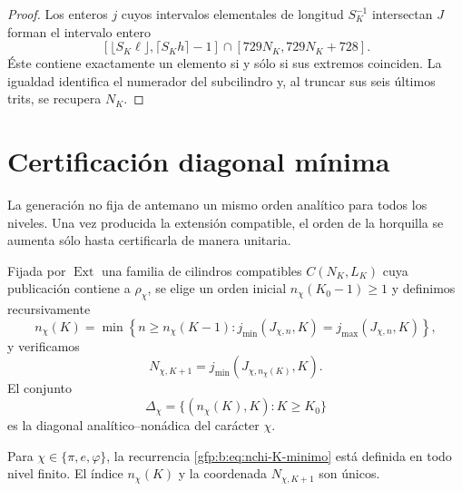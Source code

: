 \begin{proof}
Los enteros \(j\) cuyos intervalos elementales de longitud \(S_K^{-1}\)
intersectan \(J\) forman el intervalo entero
\[
 \left[
 \lfloor S_K\ell\rfloor,
 \lceil S_Kh\rceil-1
 \right]\cap
 [729N_K,729N_K+728].
\]
Éste contiene exactamente un elemento si y sólo si sus extremos coinciden.
La igualdad identifica el numerador del subcilindro y, al truncar sus seis
últimos trits, se recupera \(N_K\).
\end{proof}

\section{Certificación diagonal mínima}

La generación no fija de antemano un mismo orden analítico para todos los
niveles. Una vez producida la extensión compatible, el orden de la
horquilla se aumenta sólo hasta certificarla de manera unitaria.

\begin{definition}
\label{gfp:b:def:recurrencia-diagonal-constantes}
Fijada por \(\operatorname{Ext}\) una familia de cilindros compatibles
\(C(N_K,L_K)\) cuya publicación contiene a \(\rho_\chi\), se elige un orden
inicial \(n_\chi(K_0-1)\geq1\) y definimos recursivamente
\begin{equation}
 n_\chi(K)=
 \min\left\{
 n\geq n_\chi(K-1):
 j_{\min}(J_{\chi,n},K)=j_{\max}(J_{\chi,n},K)
 \right\},
 \label{gfp:b:eq:nchi-K-minimo}
\end{equation}
y verificamos
\begin{equation}
 N_{\chi,K+1}
 =j_{\min}(J_{\chi,n_\chi(K)},K).
 \label{gfp:b:eq:Nchi-K-mas-uno}
\end{equation}
El conjunto
\[
 \Delta_\chi=
 \{(n_\chi(K),K):K\geq K_0\}
\]
es la diagonal analítico--nonádica del carácter \(\chi\).
\end{definition}

\begin{theorem}
\label{gfp:b:thm:existencia-unicidad-diagonal}
Para \(\chi\in\{\pi,e,\varphi\}\), la recurrencia
\eqref{gfp:b:eq:nchi-K-minimo} está definida en todo nivel finito. El índice
\(n_\chi(K)\) y la coordenada \(N_{\chi,K+1}\) son únicos.
\end{theorem}

